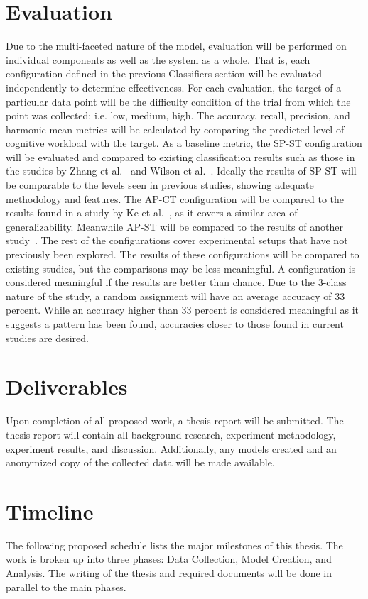 \documentclass[11pt]{article}
\begin{document}
\section{Evaluation}
Due to the multi-faceted nature of the model, evaluation will be performed on individual components as well as the system as a whole. That is, each configuration defined in the previous Classifiers section will be evaluated independently to determine effectiveness. For each evaluation, the target of a particular data point will be the difficulty condition of the trial from which the point was collected; i.e. low, medium, high. The accuracy, recall, precision, and harmonic mean metrics will be calculated by comparing the predicted level of cognitive workload with the target. As a baseline metric, the SP-ST configuration will be evaluated and compared to existing classification results such as those in the studies by Zhang et al.~\cite{Zhang} and Wilson et al.~\cite{Wilson}. Ideally the results of SP-ST will be comparable to the levels seen in previous studies, showing adequate methodology and features. The AP-CT configuration will be compared to the results found in a study by Ke et al.~\cite{Ke}, as it covers a similar area of generalizability. Meanwhile AP-ST will be compared to the results of another study~\cite{Wang_Z}. The rest of the configurations cover experimental setups that have not previously been explored. The results of these configurations will be compared to existing studies, but the comparisons may be less meaningful. A configuration is considered meaningful if the results are better than chance. Due to the 3-class nature of the study, a random assignment will have an average accuracy of 33 percent. While an accuracy higher than 33 percent is considered meaningful as it suggests a pattern has been found, accuracies closer to those found in current studies are desired.

\section{Deliverables}
Upon completion of all proposed work, a thesis report will be submitted. The thesis report will contain all background research, experiment methodology, experiment results, and discussion. Additionally, any models created and an anonymized copy of the collected data will be made available. 

\section{Timeline}
The following proposed schedule lists the major milestones of this thesis. The work is broken up into three phases: Data Collection, Model Creation, and Analysis. The writing of the thesis and required documents will be done in parallel to the main phases.
\end{document}
